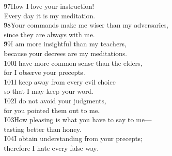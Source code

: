 \begin{poetry}
\poeml \v{97}How I love your instruction! \\
\poemll    Every day it is my meditation. \\
\poeml \v{98}Your commands make me wiser than my adversaries, \\
\poemll    since they are always with me. \\
\poeml \v{99}I am more insightful than my teachers, \\
\poemll    because your decrees are my meditations. \\
\poeml \v{100}I have more common sense than the elders, \\
\poemll    for I observe your precepts. \\
\poeml \v{101}I keep away from every evil choice \\
\poemll    so that I may keep your word. \\
\poeml \v{102}I do not avoid your judgments, \\
\poemll    for you pointed them out to me. \\
\poeml \v{103}How pleasing is what you have to say to me--- \\
\poemll    tasting better than honey. \\
\poeml \v{104}I obtain understanding from your precepts; \\
\poemll    therefore I hate every false way.
\end{poetry}

